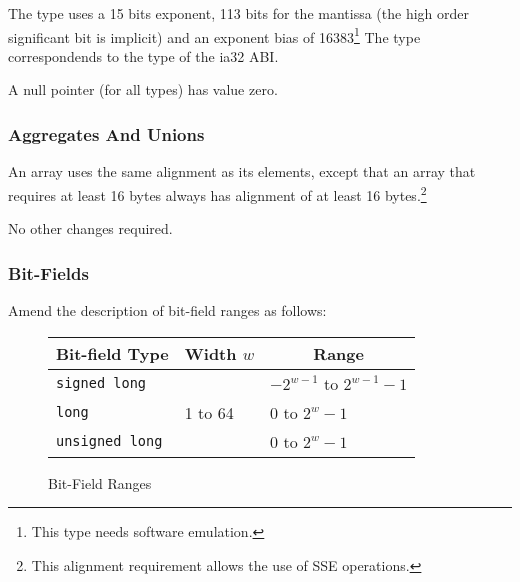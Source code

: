 The  type uses a 15 bits exponent, 113 bits for the
mantissa (the high order significant bit is implicit) and an exponent
bias of 16383\footnote{This type needs software emulation.}  The
 type correspondends to the  type of
the ia32 ABI.



A null pointer (for all types) has value zero.


\subsubsection{Aggregates And Unions}

An array uses the same alignment as its elements, except that an array
that requires at least 16 bytes always has alignment of at least 16
bytes.\footnote{This alignment requirement allows the use of SSE
  operations.}


No other changes required.

\subsubsection{Bit-Fields}

Amend the description of bit-field ranges as follows:

\begin{figure}[h]
  \begin{center}
    \leavevmode
    \begin{tabular}{l|l|l}
      \multicolumn{1}{c}{Bit-field Type} 
         & \multicolumn{1}{c}{Width $w$} 
         & \multicolumn{1}{c}{Range} \\
      \hline
      \texttt{signed long} & & $-2^{w - 1}$ to $2^{w-1}-1$ \\
      \texttt{long} & 1 to 64 & 0 to $2^{w}-1$ \\
      \texttt{unsigned long} & & 0 to $2^{w}-1$ \\
    \end{tabular}
  \end{center}
  \caption{Bit-Field Ranges}
\end{figure}

